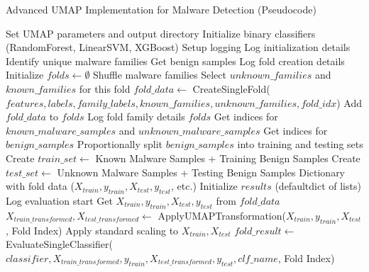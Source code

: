 \begin{algorithm}[!htbp]
\caption{Advanced UMAP Implementation for Malware Detection (Pseudocode)}
\label{alg:umap-implementation}
\begin{algorithmic}[1]
    \State Set UMAP parameters and output directory
    \State Initialize binary classifiers (RandomForest, LinearSVM, XGBoost)
    \State Setup logging
    \State Log initialization details
\EndProcedure
\Statex
{}
    \State Identify unique malware families
    \State Get benign samples
    \State Log fold creation details
    \State Initialize $folds \leftarrow \emptyset$
    \State Shuffle malware families
        \State Select $unknown\_families$ and $known\_families$ for this fold
        \State $fold\_data \leftarrow$ CreateSingleFold($features, labels, family\_labels, known\_families, unknown\_families, fold\_idx$)
        \State Add $fold\_data$ to $folds$
        \State Log fold family details
    \EndFor
    \Return $folds$
\EndProcedure
\Statex
{}
    \State Get indices for $known\_malware\_samples$ and $unknown\_malware\_samples$
    \State Get indices for $benign\_samples$
    \State Proportionally split $benign\_samples$ into training and testing sets
    \State Create $train\_set \leftarrow$ Known Malware Samples + Training Benign Samples
    \State Create $test\_set \leftarrow$ Unknown Malware Samples + Testing Benign Samples
    \Return Dictionary with fold data ($X_{train}, y_{train}, X_{test}, y_{test}$, etc.)
\EndProcedure
\Statex
{}
    \State Initialize $results$ (defaultdict of lists)
    \State Log evaluation start
        \State Get $X_{train}, y_{train}, X_{test}, y_{test}$ from $fold\_data$
            \State $X_{train\_transformed}, X_{test\_transformed} \leftarrow$ ApplyUMAPTransformation($X_{train}, y_{train}, X_{test}$, Fold Index)
        \Else
            \State Apply standard scaling to $X_{train}, X_{test}$
        \EndIf
            \State $fold\_result \leftarrow$ EvaluateSingleClassifier($classifier, X_{train\_transformed}, y_{train}, X_{test\_transformed}, y_{test}, clf\_name$, Fold Index)

\end{algorithmic}
\end{algorithm}
